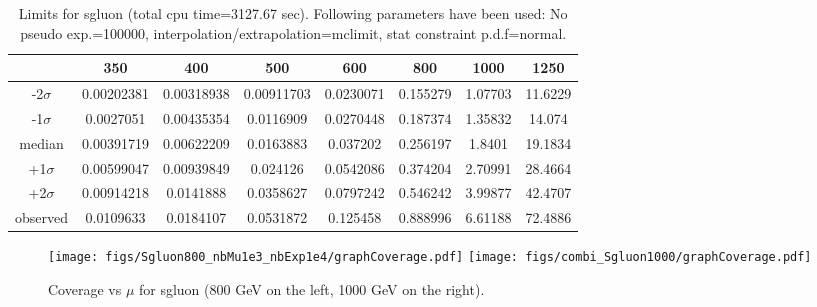 \documentclass[a4paper,notitlepage]{article}
\begin{document}
 
\begin{table}
\begin{center}
\caption{Limits for sgluon (total cpu time=3127.67 sec). Following parameters have been used: No pseudo exp.=100000, interpolation/extrapolation=mclimit, stat constraint p.d.f=normal.}
\begin{tabular}{ | c | c | c | c | c | c | c | c |}
\hline
  & 350 & 400 & 500 & 600 & 800 & 1000 & 1250 \\ \hline
-2$\sigma$ &0.00202381 & 0.00318938 & 0.00911703 & 0.0230071 & 0.155279 & 1.07703 & 11.6229 \\ \hline 
-1$\sigma$ &0.0027051 & 0.00435354 & 0.0116909 & 0.0270448 & 0.187374 & 1.35832 & 14.074 \\ \hline 
median &0.00391719 & 0.00622209 & 0.0163883 & 0.037202 & 0.256197 & 1.8401 & 19.1834 \\ \hline 
+1$\sigma$ &0.00599047 & 0.00939849 & 0.024126 & 0.0542086 & 0.374204 & 2.70991 & 28.4664 \\ \hline 
+2$\sigma$ &0.00914218 & 0.0141888 & 0.0358627 & 0.0797242 & 0.546242 & 3.99877 & 42.4707 \\ \hline 
observed &0.0109633 & 0.0184107 & 0.0531872 & 0.125458 & 0.888996 & 6.61188 & 72.4886 \\ \hline 
\end{tabular}
\end{center}
\end{table}



\clearpage

\begin{figure}[!htb]
\begin{center}
\texttt{[image: figs/Sgluon800\_nbMu1e3\_nbExp1e4/graphCoverage.pdf]}
\texttt{[image: figs/combi\_Sgluon1000/graphCoverage.pdf]}
\caption{Coverage vs $\mu$ for sgluon (800 GeV on the left, 1000 GeV on the right).}
\end{center}
\end{figure} 
\end{document}
